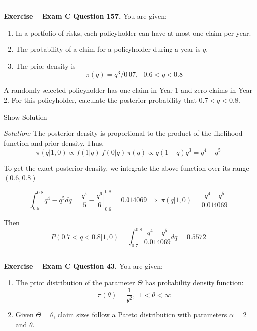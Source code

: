 \documentclass[]{book}
\providecommand{\tightlist}{%
  \setlength{\itemsep}{0pt}\setlength{\parskip}{0pt}}
\theoremstyle{definition}
\theoremstyle{definition}
\theoremstyle{definition}
\theoremstyle{remark}
\begin{document}
\begin{center}\rule{0.5\linewidth}{\linethickness}\end{center}

\textbf{Exercise -- Exam C Question 157.} You are given:

\begin{enumerate}
\def\labelenumi{(\roman{enumi})}
\tightlist
\item
  In a portfolio of risks, each policyholder can have at most one claim
  per year.
\item
  The probability of a claim for a policyholder during a year is \(q\).
\item
  The prior density is \[\pi(q) = q^3/0.07, \ \ \ 0.6 < q < 0.8\]
\end{enumerate}

A randomly selected policyholder has one claim in Year 1 and zero claims
in Year 2. For this policyholder, calculate the posterior probability
that \(0.7 < q < 0.8\).

Show Solution

\hypertarget{toggleExamC157}{}
\emph{Solution:} The posterior density is proportional to the product of
the likelihood function and prior density. Thus,
\[\pi(q|1,0) \propto f(1|q)\ f(0|q)\ \pi(q) \propto q(1-q)q^3 = q^4-q^5\]

To get the exact posterior density, we integrate the above function over
its range \((0.6, 0.8)\)

\[\int_{0.6}^{0.8} q^4-q^5 dq = \frac{q^5}{5} - \left. \frac{q^6}{6} \right|_{0.6}^{0.8} = 0.014069 \ \Rightarrow \ \pi(q|1,0)=\frac{q^4-q^5}{0.014069}\]

Then
\[P(0.7<q<0.8|1,0)= \int_{0.7}^{0.8} \frac{q^4-q^5}{0.014069}dq = 0.5572\]

\begin{center}\rule{0.5\linewidth}{\linethickness}\end{center}

\textbf{Exercise -- Exam C Question 43.} You are given:

\begin{enumerate}
\def\labelenumi{(\roman{enumi})}
\tightlist
\item
  The prior distribution of the parameter \(\Theta\) has probability
  density function:
  \[\pi(\theta) = \frac{1}{\theta^2}, \ \ 1 < \theta < \infty\]
\item
  Given \(\Theta = \theta\), claim sizes follow a Pareto distribution
  with parameters \(\alpha=2\) and \(\theta\).
\end{enumerate}
\end{document}

